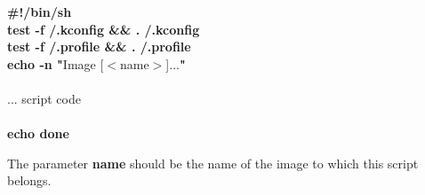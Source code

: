 \begin{Command}{9cm}
\textbf{\#!/bin/sh}\\
\textbf{test -f /.kconfig \&\& . /.kconfig}\\
\textbf{test -f /.profile \&\& . /.profile}\\
\textbf{echo -n "}Image [$<$name$>$]...\textbf{"}\\
\\
... script code\\
\\
\textbf{echo done}
\end{Command}

The parameter \textbf{name} should be the name of the image to which this
script belongs.

